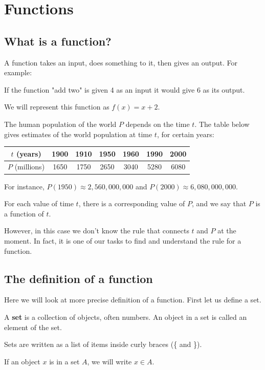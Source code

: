 \chapter{Functions}
\section{What is a function?}
A function takes an input, does something to it, then gives an output. For example:
\begin{example}
If the function "add two" is given 4 as an input it would give 6 as its output.

We will represent this function as \(f(x)=x+2\).
\end{example}

\begin{example}
The human population of the world $P$ depends on the time $t$. The table below gives estimates of the world population at time $t$, for certain years:
\begin{center}
    \begin{tabular}{ | c | c | c | c | c | c | c |}
    \hline
    $t$ (years) & 1900 & 1910 & 1950 & 1960 & 1990 & 2000  \\ \hline
    $P$ (millions) & 1650 & 1750 & 2650 & 3040 & 5280 & 6080  \\ \hline
    \end{tabular}
\end{center}
For instance, $P(1950)\approx 2,560,000,000$ and $P(2000)\approx 6,080,000,000$.

For each value of time $t$, there is a corresponding value of $P$, and we say that $P$ is a function of $t$.

However, in this case we don't know the rule that connects $t$ and $P$ at the moment. In fact, it is one of our tasks to find and understand the rule for a function.
\end{example}

\section{The definition of a function}
Here we will look at more precise definition of a function. First let us define a set.

\begin{definition}
A {\bf set} is a collection of objects, often numbers. An object in a set is called an element of the set.

Sets are written as a list of items inside curly braces (\{ and \}).

If an object \(x\) is in a set \(A\), we will write \(x\in A\).
\end{definition}


